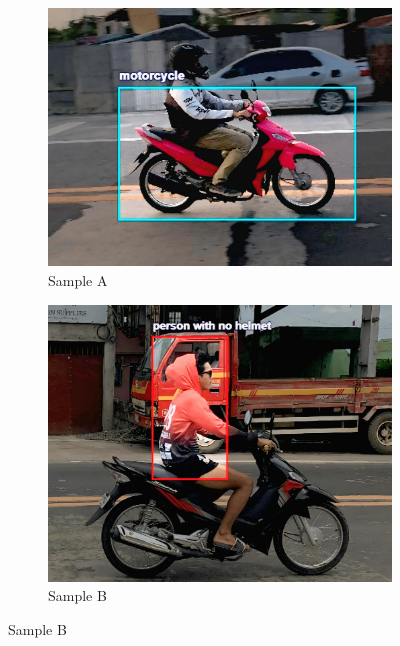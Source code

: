 \begin{refsection}
\begin{figure}[H]
    \begin{subfigure}{0.45\textwidth}
        \centering
        \includegraphics[width=\linewidth]{figures/Fig 4a.jpg}
        \caption{Sample A}
        \label{fig:4a}
    \end{subfigure}
    \hfill
    \begin{subfigure}{0.45\textwidth}
        \centering
        \includegraphics[width=\linewidth]{figures/Fig 4b.jpg}
        \caption{Sample B}
        \label{fig:4b}
    \end{subfigure}
   

\end{figure}
\end{refsection}
